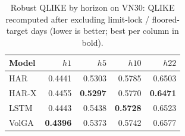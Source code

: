 \begin{table}[t]
\centering
\caption{Robust QLIKE by horizon on VN30: QLIKE recomputed after excluding limit-lock / floored-target days (lower is better; best per column in bold).}
\label{tab:qlike_robust_vn30}
\begin{tabular}{lrrrr}
\toprule
Model & $h1$ & $h5$ & $h10$ & $h22$ \\
\midrule
HAR & 0.4441 & 0.5303 & 0.5785 & 0.6503 \\
HAR-X & 0.4455 & \textbf{0.5297} & 0.5770 & \textbf{0.6471} \\
LSTM & 0.4443 & 0.5438 & \textbf{0.5728} & 0.6523 \\
VolGA & \textbf{0.4396} & 0.5373 & 0.5742 & 0.6577 \\
\bottomrule
\end{tabular}
\end{table}
